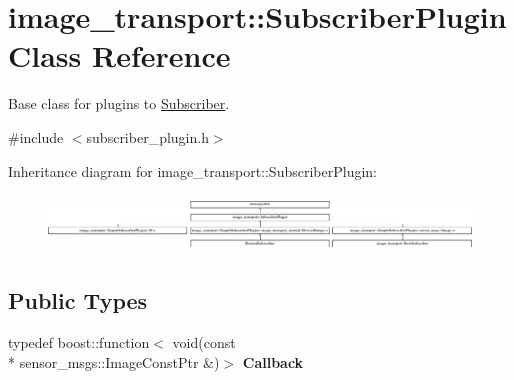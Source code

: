 \hypertarget{classimage__transport_1_1_subscriber_plugin}{\section{image\-\_\-transport\-:\-:Subscriber\-Plugin Class Reference}
\label{classimage__transport_1_1_subscriber_plugin}
}


Base class for plugins to \hyperlink{classimage__transport_1_1_subscriber}{Subscriber}.  




{\ttfamily \#include $<$subscriber\-\_\-plugin.\-h$>$}

Inheritance diagram for image\-\_\-transport\-:\-:Subscriber\-Plugin\-:\begin{figure}[H]
\begin{center}
\leavevmode
\includegraphics[height=1.517615cm]{classimage__transport_1_1_subscriber_plugin}
\end{center}
\end{figure}
\subsection*{Public Types}
\begin{DoxyCompactItemize}
\item 
\hypertarget{classimage__transport_1_1_subscriber_plugin_a0e3d423158a12f55e528b108d6dfda19}{typedef boost\-::function$<$ void(const \\*
sensor\-\_\-msgs\-::\-Image\-Const\-Ptr \&)$>$ {\bfseries Callback}}\label{classimage__transport_1_1_subscriber_plugin_a0e3d423158a12f55e528b108d6dfda19}

\end{DoxyCompactItemize}
